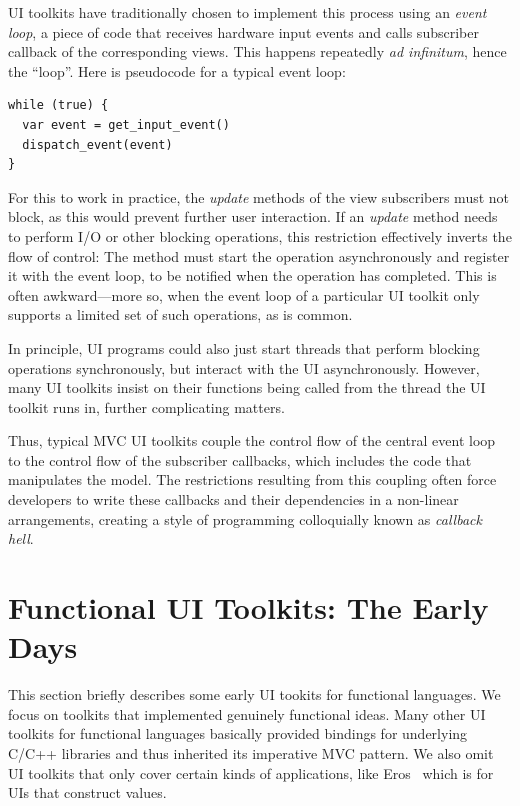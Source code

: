 \documentclass[sigplan,review,screen]{acmart}
\begin{document}
UI toolkits have traditionally chosen to implement this process using
an \textit{event loop}, a piece of code that receives hardware input
events and calls subscriber callback of the corresponding
views.  This happens repeatedly \textit{ad infinitum}, hence the
``loop''.  Here is pseudocode for a typical event loop:
%
\begin{verbatim}
while (true) {
  var event = get_input_event()
  dispatch_event(event)
}
\end{verbatim}
%
For this to work in practice, the \textit{update} methods of the view
subscribers must not block, as this would prevent further user
interaction.  If an \textit{update} method needs to perform I/O or
other blocking operations, this restriction effectively inverts the
flow of control: The method must start the operation asynchronously
and register it with the event loop, to be notified when the operation
has completed.  This is often awkward---more so, when the event loop
of a particular UI toolkit only supports a limited set of such
operations, as is common.

In principle, UI programs could also just start threads that perform
blocking operations synchronously, but interact with the UI
asynchronously.  However, many UI toolkits insist on their functions
being called from the thread the UI toolkit runs in, further
complicating matters.

Thus, typical MVC UI toolkits couple the control flow of the
central event loop to the control flow of the subscriber callbacks,
which includes the code that manipulates the model.  The restrictions
resulting from this coupling often force developers to write these
callbacks and their dependencies in a non-linear arrangements,
creating a style of programming colloquially known as \textit{callback
  hell}.

\section{Functional UI Toolkits: The Early Days}
\label{sec:functional-ui}

This section briefly describes some early UI tookits for functional
languages.  We focus on toolkits that implemented genuinely
functional ideas.  Many other UI toolkits for functional languages
basically provided bindings for underlying C/C++ libraries and thus
inherited its imperative MVC pattern.  We also omit UI toolkits that
only cover certain kinds of applications, like Eros~\cite{Eros} which is
for UIs that construct values.
\end{document}
